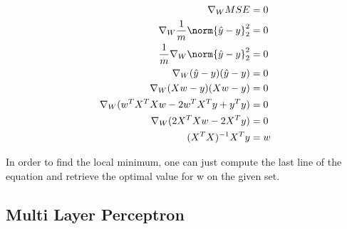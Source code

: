 		\begin{equation} \label{eq1}
			\begin{split}
				\nabla_W MSE &= 0 \\
				\nabla_W \frac{1}{m} \norm{\hat{y} - y}_2^2 &= 0 \\
				\frac{1}{m} \nabla_W \norm{\hat{y} - y}_2^2 &= 0 \\
				\nabla_W (\hat{y} - y)(\hat{y} - y) &= 0 \\
				\nabla_W (X w - y)(X w - y) &= 0 \\
				\nabla_W (w^T X^T X w - 2 w^T X^T y + y^T y) &= 0 \\
				\nabla_W (2 X^T X w - 2 X^T y) &= 0 \\
				(X^T X)^{-1} X^T y &= w
			\end{split}
		\end{equation}

		In order to find the local minimum, one can just compute the last line of the equation and retrieve the optimal value for w on the given set.


	\subsection{Multi Layer Perceptron}



